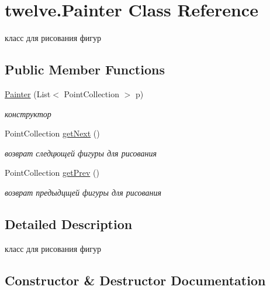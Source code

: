 \hypertarget{classtwelve_1_1_painter}{}\section{twelve.\+Painter Class Reference}
\label{classtwelve_1_1_painter}


класс для рисования фигур  


\subsection*{Public Member Functions}
\begin{DoxyCompactItemize}
\item 
\hyperlink{classtwelve_1_1_painter_ac255c01832d4193a56ae7970ce5f89cb}{Painter} (List$<$ Point\+Collection $>$ p)
\begin{DoxyCompactList}\small\item\em конструктор \end{DoxyCompactList}\item 
Point\+Collection \hyperlink{classtwelve_1_1_painter_a78b40befdad73558084ce99fee95d949}{get\+Next} ()
\begin{DoxyCompactList}\small\item\em возврат следцющей фигуры для рисования \end{DoxyCompactList}\item 
Point\+Collection \hyperlink{classtwelve_1_1_painter_aad43b013c8b8feef706816916c6c18ff}{get\+Prev} ()
\begin{DoxyCompactList}\small\item\em возврат предыдцщей фигуры для рисования \end{DoxyCompactList}\end{DoxyCompactItemize}


\subsection{Detailed Description}
класс для рисования фигур 



\subsection{Constructor \& Destructor Documentation}
\hypertarget{classtwelve_1_1_painter_ac255c01832d4193a56ae7970ce5f89cb}{}
